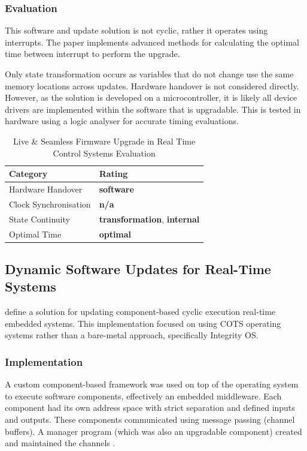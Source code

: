 \subsubsection{Evaluation}
This software and update solution is not cyclic, rather it operates using interrupts. The paper implements advanced methods for calculating the optimal time between interrupt to perform the upgrade.

Only state transformation occurs as variables that do not change use the same memory locations across updates. Hardware handover is not considered directly. However, as the solution is developed on a microcontroller, it is likely all device drivers are implemented within the software that is upgradable. This is tested in hardware using a logic analyser for accurate timing evaluations.

\begin{table}[ht]
    \centering
    \begin{tabular}{l|l}
    Category & Rating  \\ \hline
    Hardware Handover & \textbf{software} \\
    Clock Synchronisation & \textbf{n/a} \\
    State Continuity & \textbf{transformation}, \textbf{internal} \\
    Optimal Time & \textbf{optimal} 
    \end{tabular}
    \caption[Live \& Seamless Firmware Upgrade in Real Time Control Systems Evaluation]
    {Live \& Seamless Firmware Upgrade in Real Time Control Systems Evaluation}
    \label{tbl:raoLiveSeamlessFirmware2023Evaluation}
\end{table}

\clearpage


\subsection{Dynamic Software Updates for Real-Time Systems} \label{caseStudy2}
\textcite{wahlerDynamicSoftwareUpdates2009} define a solution for updating component-based cyclic execution real-time embedded systems. This implementation focused on using COTS operating systems rather than a bare-metal approach, specifically Integrity OS.

\subsubsection{Implementation}
A custom component-based framework was used on top of the operating system to execute software components, effectively an embedded middleware. Each component had its own address space with strict separation and defined inputs and outputs. These components communicated using message passing (channel buffers). A manager program (which was also an upgradable component) created and maintained the channels \autocite{wahlerDynamicSoftwareUpdates2009}.

